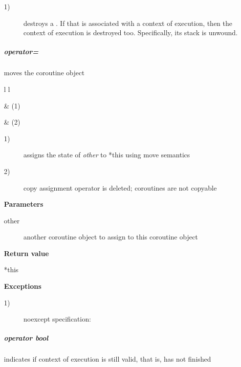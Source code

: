 \begin{description}
    \item[1)] destroys a \pushcoro. If that \pushcoro is associated with a context of execution,
              then the context of execution is destroyed too. Specifically,
              its stack is unwound.\\
\end{description}

\subparagraph*{operator=}
moves the coroutine object\\

\begin{tabular}{ l l }
    \midrule

     & (1)\\

    \midrule

     & (2)\\

    \midrule
\end{tabular}

\begin{description}
    \item[1)] assigns the state of \textit{other} to *this using move semantics
    \item[2)] copy assignment operator is deleted; coroutines are not copyable\\
\end{description}

{\bf Parameters}
\begin{description}
    \item[other]   another coroutine object to assign to this coroutine object\\
\end{description}

{\bf Return value}
\begin{description}
    \item[*this]
\end{description}

{\bf Exceptions}
\begin{description}
    \item[1)] noexcept specification: \\
\end{description}

\subparagraph*{operator bool}
indicates if context of execution is still valid, that is, \corofunction has not
finished\\


